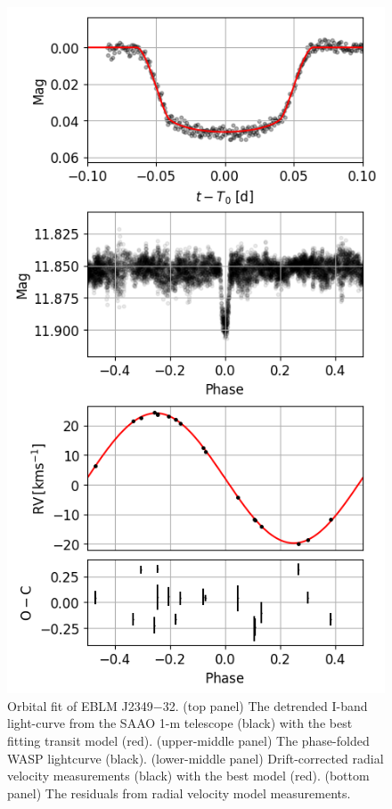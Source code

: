 \begin{figure}[htb]
  \centering
  \includegraphics[scale=0.8]{8-Results/J2349-32/orbital.png}
  \caption{Orbital fit of EBLM J2349$-$32. (top panel) The detrended I-band light-curve from the SAAO 1-m telescope (black) with the best fitting transit model (red). (upper-middle panel) The phase-folded WASP lightcurve (black).  (lower-middle panel) Drift-corrected radial velocity measurements (black) with the best model (red). (bottom panel) The residuals from radial velocity model measurements.}
  \label{fig:J2349-32:orbit}
\end{figure}

